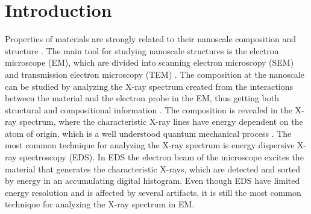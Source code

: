 \chapter{Introduction}
\label{chap:introduction}



%  
%  






Properties of materials are strongly related to their nanoscale composition and structure \cite{callister2014materials}.
The main tool for studying nanoscale structures is the electron microscope (EM), which are divided into scanning electron microscopy (SEM) and transmission electron microscopy (TEM) \cite{goldstein_scanning_2018,williams_carter_tem_2009}.
The composition at the nanoscale can be studied by analyzing the X-ray spectrum created from the interactions between the material and the electron probe in the EM, thus getting both structural and compositional information \cite{jenkins_xrayspectroscopy}.
The composition is revealed in the X-ray spectrum, where the characteristic X-ray lines have energy dependent on the atom of origin, which is a well understood quantum mechanical process \cite{hollas_modern_2004,goldstein_scanning_2018}.
The most common technique for analyzing the X-ray spectrum is energy dispersive X-ray spectroscopy (EDS).
In EDS the electron beam of the microscope excites the material that generates the characteristic X-rays, which are detected and sorted by energy in an accumulating digital histogram.
Even though EDS have limited energy resolution and is affected by several artifacts, it is still the most common technique for analyzing the X-ray spectrum in EM.

